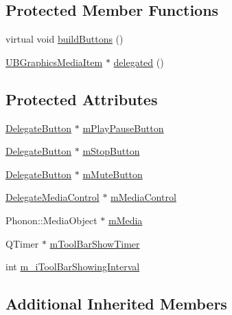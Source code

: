 \subsection*{Protected Member Functions}
\begin{DoxyCompactItemize}
\item 
virtual void \hyperlink{class_u_b_graphics_media_item_delegate_a8e53c735a7bd5267fca9ae39088e8248}{build\-Buttons} ()
\item 
\hyperlink{class_u_b_graphics_media_item}{U\-B\-Graphics\-Media\-Item} $\ast$ \hyperlink{class_u_b_graphics_media_item_delegate_aa305fb51703f64d95297bea405d405c0}{delegated} ()
\end{DoxyCompactItemize}
\subsection*{Protected Attributes}
\begin{DoxyCompactItemize}
\item 
\hyperlink{class_delegate_button}{Delegate\-Button} $\ast$ \hyperlink{class_u_b_graphics_media_item_delegate_a10af235b512235a940a35b4b2988cde5}{m\-Play\-Pause\-Button}
\item 
\hyperlink{class_delegate_button}{Delegate\-Button} $\ast$ \hyperlink{class_u_b_graphics_media_item_delegate_a1e4e109e8f668e66fc0ebfcb22fd024d}{m\-Stop\-Button}
\item 
\hyperlink{class_delegate_button}{Delegate\-Button} $\ast$ \hyperlink{class_u_b_graphics_media_item_delegate_af04cff1ac6ce4dea0ac103c95f740007}{m\-Mute\-Button}
\item 
\hyperlink{class_delegate_media_control}{Delegate\-Media\-Control} $\ast$ \hyperlink{class_u_b_graphics_media_item_delegate_a68cba7dc02297fe37d7c0f8ace77b280}{m\-Media\-Control}
\item 
Phonon\-::\-Media\-Object $\ast$ \hyperlink{class_u_b_graphics_media_item_delegate_ae6c2550cd7836da9af6f1250248e819b}{m\-Media}
\item 
Q\-Timer $\ast$ \hyperlink{class_u_b_graphics_media_item_delegate_a3f7c09c6bfaeb788b1b85c0225c78f8d}{m\-Tool\-Bar\-Show\-Timer}
\item 
int \hyperlink{class_u_b_graphics_media_item_delegate_a3100e67e3ea0de481796fe948317da6e}{m\-\_\-i\-Tool\-Bar\-Showing\-Interval}
\end{DoxyCompactItemize}
\subsection*{Additional Inherited Members}


